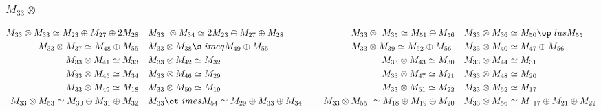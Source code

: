 \subsubsection{$M_33\otimes -$}
\begin{align*}
M_{33} \otimes M_{33} \simeq M_{23} \oplus M_{27} \oplus 2 M_{28} &&& M_{33} \
\otimes M_{34} \simeq 2 M_{23} \oplus M_{27} \oplus M_{28} &&& M_{33} \otimes \
M_{35} \simeq M_{51} \oplus M_{56} &&& M_{33} \otimes M_{36} \simeq M_{50} \op\
lus M_{55}\\
M_{33} \otimes M_{37} \simeq M_{48} \oplus M_{55} &&& M_{33} \otimes M_{38} \s\
imeq M_{49} \oplus M_{55} &&& M_{33} \otimes M_{39} \simeq M_{52} \oplus M_{56\
} &&& M_{33} \otimes M_{40} \simeq M_{47} \oplus M_{56}\\
M_{33} \otimes M_{41} \simeq M_{33} &&& M_{33} \otimes M_{42} \simeq M_{32} &&\
& M_{33} \otimes M_{43} \simeq M_{30} &&& M_{33} \otimes M_{44} \simeq M_{31}\
\\
M_{33} \otimes M_{45} \simeq M_{34} &&& M_{33} \otimes M_{46} \simeq M_{29} &&\
& M_{33} \otimes M_{47} \simeq M_{21} &&& M_{33} \otimes M_{48} \simeq M_{20}\
\\
M_{33} \otimes M_{49} \simeq M_{18} &&& M_{33} \otimes M_{50} \simeq M_{19} &&\
& M_{33} \otimes M_{51} \simeq M_{22} &&& M_{33} \otimes M_{52} \simeq M_{17}\
\\
M_{33} \otimes M_{53} \simeq M_{30} \oplus M_{31} \oplus M_{32} &&& M_{33} \ot\
imes M_{54} \simeq M_{29} \oplus M_{33} \oplus M_{34} &&& M_{33} \otimes M_{55\
} \simeq M_{18} \oplus M_{19} \oplus M_{20} &&& M_{33} \otimes M_{56} \simeq M\
_{17} \oplus M_{21} \oplus M_{22}\\
\end{align*}


